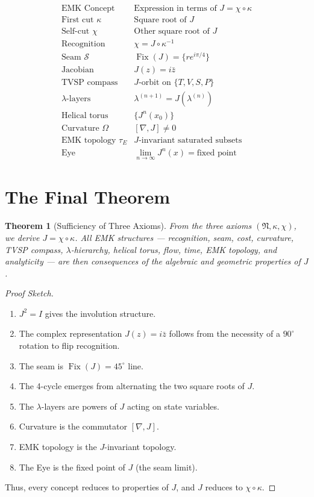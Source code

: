 \documentclass[12pt]{article}
\newtheorem{theorem}[axiom]{Theorem}
\DeclareMathOperator{\Fix}{Fix}
\begin{document}
\[
\boxed{
\begin{array}{c|c}
\text{EMK Concept} & \text{Expression in terms of } J = \chi \circ \kappa \\
\hline
\text{First cut } \kappa & \text{Square root of } J \\
\text{Self-cut } \chi & \text{Other square root of } J \\
\text{Recognition} & \chi = J \circ \kappa^{-1} \\
\text{Seam } \mathcal{S} & \Fix(J) = \{ re^{i\pi/4} \} \\
\text{Jacobian} & J(z) = i\bar{z} \\
\text{TVSP compass} & J\text{-orbit on } \{T,V,S,P\} \\
\lambda\text{-layers} & \lambda^{(n+1)} = J(\lambda^{(n)}) \\
\text{Helical torus} & \{ J^n(x_0) \} \\
\text{Curvature } \Omega & [\nabla, J] \neq 0 \\
\text{EMK topology } \tau_E & J\text{-invariant saturated subsets} \\
\text{Eye} & \lim_{n \to \infty} J^n(x) = \text{fixed point}
\end{array}
}
\]

\section{The Final Theorem}

\begin{theorem}[Sufficiency of Three Axioms]
From the three axioms \((\mathfrak N, \kappa, \chi)\), we derive \(J = \chi \circ \kappa\). 
All EMK structures — recognition, seam, cost, curvature, TVSP compass, \(\lambda\)-hierarchy, helical torus, flow, time, EMK topology, and analyticity — are then consequences of the algebraic and geometric properties of \(J\).
\end{theorem}

\begin{proof}[Proof Sketch]
\begin{enumerate}
    \item \(J^2 = I\) gives the involution structure.
    \item The complex representation \(J(z) = i\bar{z}\) follows from the necessity of a \(90^\circ\) rotation to flip recognition.
    \item The seam is \(\Fix(J) = 45^\circ\) line.
    \item The 4-cycle emerges from alternating the two square roots of \(J\).
    \item The \(\lambda\)-layers are powers of \(J\) acting on state variables.
    \item Curvature is the commutator \([\nabla, J]\).
    \item EMK topology is the \(J\)-invariant topology.
    \item The Eye is the fixed point of \(J\) (the seam limit).
\end{enumerate}
Thus, every concept reduces to properties of \(J\), and \(J\) reduces to \(\chi \circ \kappa\).
\end{proof}
\end{document}

